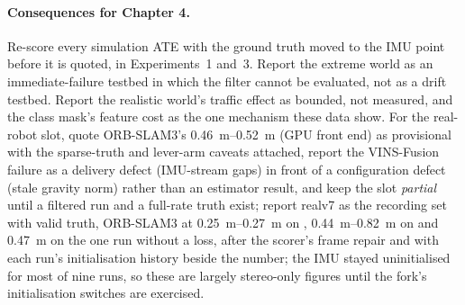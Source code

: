 \documentclass[11pt,a4paper,notitlepage]{report}
\begin{document}
\paragraph{Consequences for Chapter 4.} Re-score every simulation ATE with the
ground truth moved to the IMU point before it is quoted, in Experiments~1 and~3.
Report the extreme world as an immediate-failure testbed in which the filter
cannot be evaluated, not as a drift testbed. Report the realistic world's
traffic effect as bounded, not measured, and the class mask's feature cost as
the one mechanism these data show. For the real-robot slot, quote ORB-SLAM3's
\SIrange{0.46}{0.52}{\metre} (GPU front end) as provisional with the sparse-truth and lever-arm caveats
attached, report the VINS-Fusion failure as a delivery defect (IMU-stream gaps)
in front of a configuration defect (stale gravity norm) rather than an
estimator result, and keep the slot \emph{partial}
until a filtered run and a full-rate truth exist; report realv7 as the
recording set with valid truth, ORB-SLAM3 at \SIrange{0.25}{0.27}{\metre} on
, \SIrange{0.44}{0.82}{\metre} on  and \SI{0.47}{\metre}
on the one  run without a loss, after the scorer's frame repair and
with each run's initialisation history beside the number; the IMU stayed
uninitialised for most of nine runs, so these are largely stereo-only figures
until the fork's initialisation switches are exercised.
\end{document}
